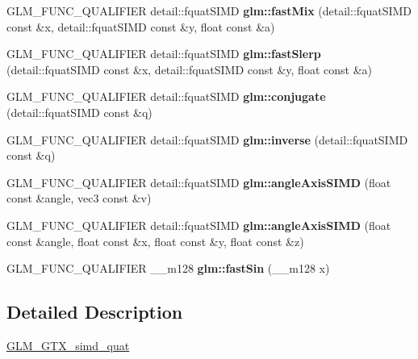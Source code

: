\begin{DoxyCompactItemize}
\item 
\mbox{\label{simd__quat_8inl_acf0fe775efd8a75dc6dc603efd157231}} 
G\+L\+M\+\_\+\+F\+U\+N\+C\+\_\+\+Q\+U\+A\+L\+I\+F\+I\+ER detail\+::fquat\+S\+I\+MD {\bfseries glm\+::fast\+Mix} (detail\+::fquat\+S\+I\+MD const \&x, detail\+::fquat\+S\+I\+MD const \&y, float const \&a)
\item 
\mbox{\label{simd__quat_8inl_a57c9ec50932abd564671a28cd7ba53e0}} 
G\+L\+M\+\_\+\+F\+U\+N\+C\+\_\+\+Q\+U\+A\+L\+I\+F\+I\+ER detail\+::fquat\+S\+I\+MD {\bfseries glm\+::fast\+Slerp} (detail\+::fquat\+S\+I\+MD const \&x, detail\+::fquat\+S\+I\+MD const \&y, float const \&a)
\item 
\mbox{\label{simd__quat_8inl_a079af2a66c2439c64053382e8c98f213}} 
G\+L\+M\+\_\+\+F\+U\+N\+C\+\_\+\+Q\+U\+A\+L\+I\+F\+I\+ER detail\+::fquat\+S\+I\+MD {\bfseries glm\+::conjugate} (detail\+::fquat\+S\+I\+MD const \&q)
\item 
\mbox{\label{simd__quat_8inl_ad723ad1f3ef20438ade0e0c95002f187}} 
G\+L\+M\+\_\+\+F\+U\+N\+C\+\_\+\+Q\+U\+A\+L\+I\+F\+I\+ER detail\+::fquat\+S\+I\+MD {\bfseries glm\+::inverse} (detail\+::fquat\+S\+I\+MD const \&q)
\item 
\mbox{\label{simd__quat_8inl_a635900a97b69fe25d76c029f130a1c8f}} 
G\+L\+M\+\_\+\+F\+U\+N\+C\+\_\+\+Q\+U\+A\+L\+I\+F\+I\+ER detail\+::fquat\+S\+I\+MD {\bfseries glm\+::angle\+Axis\+S\+I\+MD} (float const \&angle, vec3 const \&v)
\item 
\mbox{\label{simd__quat_8inl_a8ae8890bd658ce7217abc2112e3dca35}} 
G\+L\+M\+\_\+\+F\+U\+N\+C\+\_\+\+Q\+U\+A\+L\+I\+F\+I\+ER detail\+::fquat\+S\+I\+MD {\bfseries glm\+::angle\+Axis\+S\+I\+MD} (float const \&angle, float const \&x, float const \&y, float const \&z)
\item 
\mbox{\label{simd__quat_8inl_a81de908720e51f26e86e18d37aa5cc3b}} 
G\+L\+M\+\_\+\+F\+U\+N\+C\+\_\+\+Q\+U\+A\+L\+I\+F\+I\+ER \+\_\+\+\_\+m128 {\bfseries glm\+::fast\+Sin} (\+\_\+\+\_\+m128 x)
\end{DoxyCompactItemize}


\subsection{Detailed Description}
\hyperlink{group__gtx__simd__quat}{G\+L\+M\+\_\+\+G\+T\+X\+\_\+simd\+\_\+quat} 